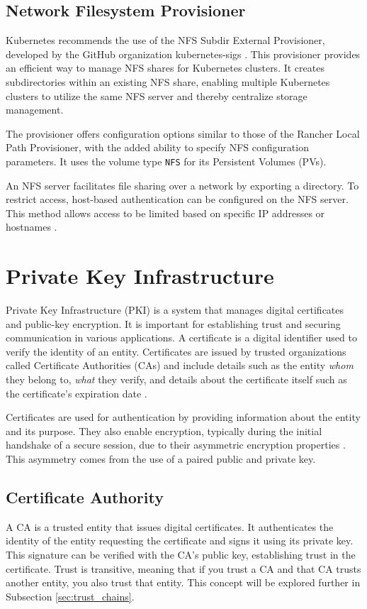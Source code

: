 \subsection{Network Filesystem Provisioner} 

Kubernetes recommends the use of the NFS Subdir External Provisioner, developed by the GitHub organization kubernetes-sigs \Parencite{kubernetes_storage_classes_nfs}. This provisioner provides an efficient way to manage NFS shares for Kubernetes clusters. It creates subdirectories within an existing NFS share, enabling multiple Kubernetes clusters to utilize the same NFS server and thereby centralize storage management.

The provisioner offers configuration options similar to those of the Rancher Local Path Provisioner, with the added ability to specify NFS configuration parameters. It uses the volume type \texttt{NFS} for its Persistent Volumes (PVs).

An NFS server facilitates file sharing over a network by exporting a directory. To restrict access, host-based authentication can be configured on the NFS server. This method allows access to be limited based on specific IP addresses or hostnames \Parencite{ubuntu_nfs_setup}.

\section{Private Key Infrastructure}

Private Key Infrastructure (PKI) is a system that manages digital certificates and public-key encryption. It is important for establishing trust and securing communication in various applications. A certificate is a digital identifier used to verify the identity of an entity. Certificates are issued by trusted organizations called Certificate Authorities (CAs) and include details such as the entity \textit{whom} they belong to, \textit{what} they verify, and details about the certificate itself such as the certificate's expiration date \Parencite{ibm_digital_certificates}.

Certificates are used for authentication by providing information about the entity and its purpose. They also enable encryption, typically during the initial handshake of a secure session, due to their asymmetric encryption properties \Parencite{cloudflare_tls_handshake}. This asymmetry comes from the use of a paired public and private key.

\subsection{Certificate Authority}
A CA is a trusted entity that issues digital certificates. It authenticates the identity of the entity requesting the certificate and signs it using its private key. This signature can be verified with the CA's public key, establishing trust in the certificate. Trust is transitive, meaning that if you trust a CA and that CA trusts another entity, you also trust that entity. This concept will be explored further in Subsection \ref{sec:trust_chains}.

